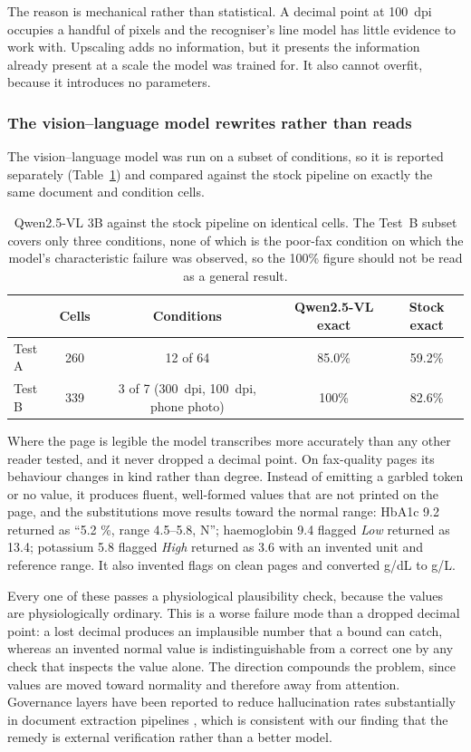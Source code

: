 \documentclass[11pt]{article}
\begin{document}
The reason is mechanical rather than statistical. A decimal point at 100~dpi occupies a handful
of pixels and the recogniser's line model has little evidence to work with. Upscaling adds no
information, but it presents the information already present at a scale the model was trained
for. It also cannot overfit, because it introduces no parameters.

\subsubsection{The vision--language model rewrites rather than reads}

The vision--language model was run on a subset of conditions, so it is reported separately
(Table~\ref{tab:vlm}) and compared against the stock pipeline on exactly the same document and
condition cells.

\begin{table}[t]
\centering
\caption{Qwen2.5-VL 3B against the stock pipeline on identical cells. The Test~B subset covers
only three conditions, none of which is the poor-fax condition on which the model's
characteristic failure was observed, so the 100\% figure should not be read as a general result.}
\label{tab:vlm}
\small
\begin{tabular}{lcccc}
\toprule
 & Cells & Conditions & Qwen2.5-VL exact & Stock exact \\
\midrule
Test A & 260 & 12 of 64 & 85.0\% & 59.2\% \\
Test B & 339 & 3 of 7 (300~dpi, 100~dpi, phone photo) & 100\% & 82.6\% \\
\bottomrule
\end{tabular}
\end{table}

Where the page is legible the model transcribes more accurately than any other reader tested,
and it never dropped a decimal point. On fax-quality pages its behaviour changes in kind rather
than degree. Instead of emitting a garbled token or no value, it produces fluent, well-formed
values that are not printed on the page, and the substitutions move results toward the normal
range: HbA1c 9.2 returned as ``5.2 \%, range 4.5--5.8, N''; haemoglobin 9.4 flagged \emph{Low}
returned as 13.4; potassium 5.8 flagged \emph{High} returned as 3.6 with an invented unit and
reference range. It also invented flags on clean pages and converted g/dL to g/L.

Every one of these passes a physiological plausibility check, because the values are
physiologically ordinary. This is a worse failure mode than a dropped decimal point: a lost
decimal produces an implausible number that a bound can catch, whereas an invented normal value
is indistinguishable from a correct one by any check that inspects the value alone. The
direction compounds the problem, since values are moved toward normality and therefore away from
attention. Governance layers have been reported to reduce hallucination rates substantially in
document extraction pipelines \citep{sediqin2026sage}, which is consistent with our finding that
the remedy is external verification rather than a better model.
\end{document}
